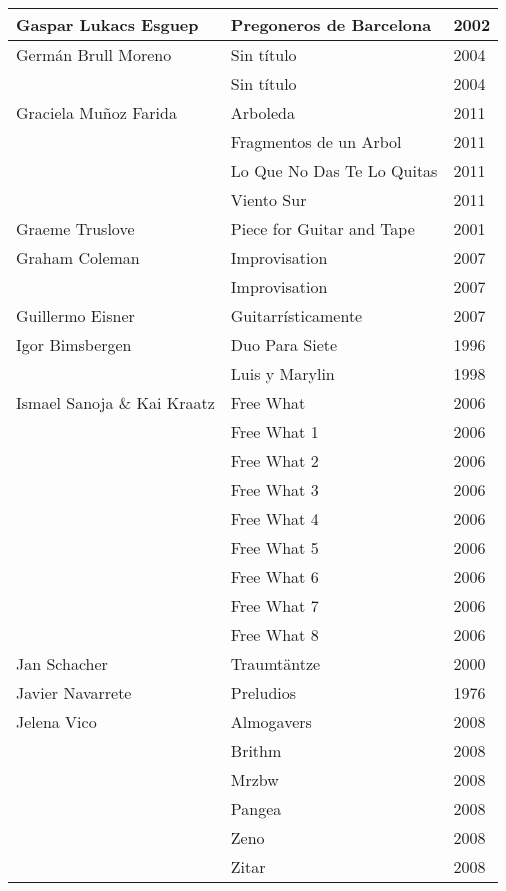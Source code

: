 \begin{center}
\begin{longtable}{ p{}  p{}  p{} }
Gaspar Lukacs Esguep & Pregoneros de Barcelona & 2002 \\ \midrule 
Germán Brull Moreno & Sin título & 2004 \\ \cmidrule (r){2-3} 
& Sin título & 2004 \\ \midrule 
Graciela Muñoz Farida & Arboleda & 2011 \\ \cmidrule (r){2-3} 
& Fragmentos de un Arbol & 2011 \\ \cmidrule (r){2-3} 
& Lo Que No Das Te Lo Quitas & 2011 \\ \cmidrule (r){2-3} 
& Viento Sur & 2011 \\ \midrule 
Graeme Truslove & Piece for Guitar and Tape & 2001 \\ \midrule 
Graham Coleman & Improvisation & 2007 \\ \cmidrule (r){2-3} 
& Improvisation & 2007 \\ \midrule 
Guillermo Eisner & Guitarrísticamente & 2007 \\ \midrule 
Igor Bimsbergen & Duo Para Siete & 1996 \\ \cmidrule (r){2-3} 
& Luis y Marylin & 1998 \\ \midrule 
Ismael Sanoja \& Kai Kraatz & Free What & 2006 \\ \cmidrule (r){2-3} 
& Free What 1 & 2006 \\ \cmidrule (r){2-3} 
& Free What 2 & 2006 \\ \cmidrule (r){2-3} 
& Free What 3 & 2006 \\ \cmidrule (r){2-3} 
& Free What 4 & 2006 \\ \cmidrule (r){2-3} 
& Free What 5 & 2006 \\ \cmidrule (r){2-3} 
& Free What 6 & 2006 \\ \cmidrule (r){2-3} 
& Free What 7 & 2006 \\ \cmidrule (r){2-3} 
& Free What 8 & 2006 \\ \midrule 
Jan Schacher & Traumtäntze & 2000 \\ \midrule 
Javier Navarrete & Preludios & 1976 \\ \midrule 
Jelena Vico & Almogavers & 2008 \\ \cmidrule (r){2-3} 
& Brithm & 2008 \\ \cmidrule (r){2-3} 
& Mrzbw & 2008 \\ \cmidrule (r){2-3} 
& Pangea & 2008 \\ \cmidrule (r){2-3} 
& Zeno & 2008 \\ \cmidrule (r){2-3} 
& Zitar & 2008 \\ \midrule 

\end{longtable}
\end{center}
